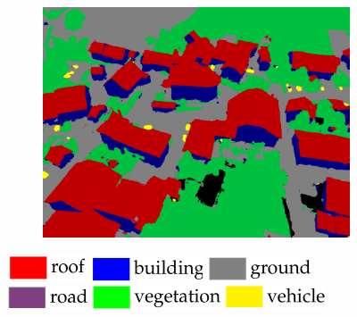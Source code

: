 \begin{figure}[H]
\begin{subfigure}[tbp]{0.21\columnwidth}
           \caption[]{}
           {{\small }}    
           \label{fig:4o}
       \end{subfigure}       
       \begin{subfigure}[tbp]{0.21\columnwidth}  
           \centering 
           \includegraphics[width=\textwidth]{segment/sullens_seg2.png}
           \caption[]{}%
           {{\small }}    
           \label{fig:4p}
      \end{subfigure}
      \protect\includegraphics[scale=1]{fig1.pdf}\quad
      \protect\includegraphics[scale=1]{fig2.pdf}\quad
      \protect\includegraphics[scale=1]{fig3.pdf}\quad
      \protect\includegraphics[scale=1]{fig4.pdf}\quad
      \protect\includegraphics[scale=1]{fig5.pdf}\quad
      \protect\includegraphics[scale=1]{fig6.pdf}\quad

\end{figure}
